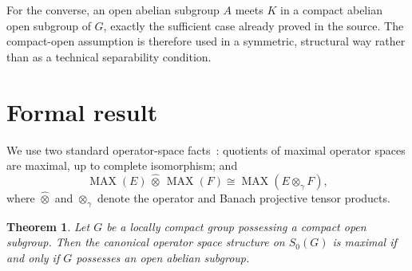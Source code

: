 \documentclass[11pt]{article}
\newtheorem{theorem}{Theorem}
\newcommand{\Szero}{S_0}
\newcommand{\MAX}{\operatorname{MAX}}
\begin{document}
For the converse, an open abelian subgroup $A$ meets $K$ in a compact
abelian open subgroup of $G$, exactly the sufficient case already proved in
the source.  The compact-open assumption is therefore used in a symmetric,
structural way rather than as a technical separability condition.

\section{Formal result}

We use two standard operator-space facts~\cite{EffrosRuan}: quotients of
maximal operator spaces are maximal, up to complete isomorphism; and
\[
 \MAX(E)\,\widehat\otimes\,\MAX(F)
 \cong \MAX(E\otimes_\gamma F),
\]
where $\widehat\otimes$ and $\otimes_\gamma$ denote the operator and Banach
projective tensor products.

\begin{theorem}\label{thm:main}
Let $G$ be a locally compact group possessing a compact open subgroup.
Then the canonical operator space structure on $\Szero(G)$ is maximal if
and only if $G$ possesses an open abelian subgroup.
\end{theorem}
\end{document}
